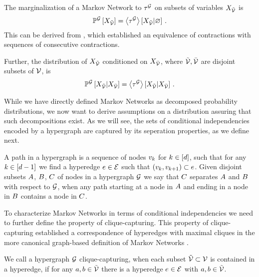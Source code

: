 The marginalization of a Markov Network to $\tau^{\mathcal{G}}$ on subsets of variables $X_{\tilde{\mathcal{V}}}$ is
\begin{align*}
    \mathbb{P}^{\mathcal{G}}\left[X_{\tilde{\mathcal{V}}}\right]
    = \left\langle \tau^{\mathcal{G}}\right\rangle \left[ X_{\tilde{\mathcal{V}}} | \varnothing \right] \, .
\end{align*}
This can be derived from , which established an equivalence of contractions with sequences of consecutive contractions.

Further, the distribution of $X_{\tilde{\mathcal{V}}}$ conditioned on $X_{\bar{\mathcal{V}}}$, where $\tilde{\mathcal{V}},\bar{\mathcal{V}}$ are disjoint subsets of $\mathcal{V}$, is
\begin{align*}
    \mathbb{P}^{\mathcal{G}}\left[X_{\tilde{\mathcal{V}}}|X_{\bar{\mathcal{V}}}\right]
    = \left\langle \tau^{\mathcal{G}}\right\rangle \left[ X_{\tilde{\mathcal{V}}} | X_{\bar{\mathcal{V}}} \right] \, .
\end{align*}

While we have directly defined Markov Networks as decomposed probability distributions, we now want to derive assumptions on a distribution assuring that such decompositions exist.
As we will see, the sets of conditional independencies encoded by a hypergraph are captured by its seperation properties, as we define next.

\begin{definition}
    A path in a hypergraph is a sequence of nodes $v_{k}$ for $k\in[d]$, such that for any $k\in[d-1]$ we find a hyperedge $e\in\mathcal{E}$ such that $(v_{k}, v_{k+1})\subset e$.
    Given disjoint subsets $A$, $B$, $C$ of nodes in a hypergraph $\mathcal{G}$ we say that $C$ separates $A$ and $B$ with respect to $\mathcal{G}$, when any path starting at a node in $A$ and ending in a node in $B$ contains a node in $C$.
\end{definition}

To characterize Markov Networks in terms of conditional independencies we need to further define the property of clique-capturing.
This property of clique-capturing established a correspondence of hyperedges with maximal cliques in the more canonical graph-based definition of Markov Networks \cite{koller_probabilistic_2009}.

\begin{definition}
    \label{def:ccHypergraph}
    We call a hypergraph $\mathcal{G}$ clique-capturing, when each subset $\tilde{\mathcal{V}}\subset\mathcal{V}$ is contained in a hyperedge, if for any $a,b\in\tilde{\mathcal{V}}$ there is a hyperedge $e\in\mathcal{E}$ with $a,b\in\tilde{\mathcal{V}}$.
\end{definition}

